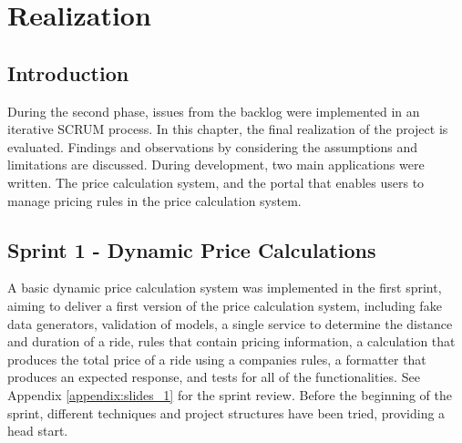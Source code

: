 \graphicspath{{Chapter6/Figs/Vector/}{Chapter6/Figs/}}

%
\chapter{Realization}
\section{Introduction}
During the second phase, issues from the backlog were implemented in an iterative SCRUM process. In this chapter, the final realization of the project is evaluated. Findings and observations by considering the assumptions and limitations are discussed. During development, two main applications were written. The price calculation system, and the portal that enables users to manage pricing rules in the price calculation system.

%
\section{Sprint 1 - Dynamic Price Calculations}
A basic dynamic price calculation system was implemented in the first sprint, aiming to deliver a first version of the price calculation system, including fake data generators, validation of models, a single service to determine the distance and duration of a ride, rules that contain pricing information, a calculation that produces the total price of a ride using a companies rules, a formatter that produces an expected response, and tests for all of the functionalities. See Appendix \ref{appendix:slides_1} for the sprint review. Before the beginning of the sprint, different techniques and project structures have been tried, providing a head start.

%
